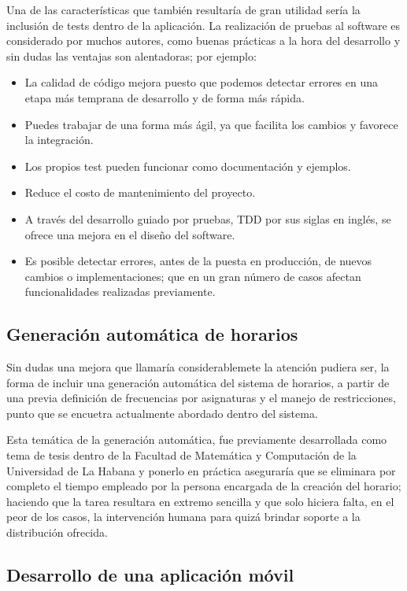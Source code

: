 Una de las características que también resultaría de gran utilidad sería la inclusión de tests dentro de la aplicación. La realización de pruebas al software es considerado por muchos autores, como buenas prácticas a la hora del desarrollo y sin dudas las ventajas son alentadoras; por ejemplo: \cite{testing} 
\begin{itemize}
	\item La calidad de código mejora puesto que podemos detectar errores en una etapa más temprana de desarrollo y de forma más rápida.
	\item Puedes trabajar de una forma más ágil, ya que facilita los cambios y favorece la integración.
	\item Los propios test pueden funcionar como documentación y ejemplos.
	\item Reduce el costo de mantenimiento del proyecto.
	\item A través del desarrollo guiado por pruebas, TDD por sus siglas en inglés, se ofrece una mejora en el diseño del software.
	\item Es posible detectar errores, antes de la puesta en producción, de nuevos cambios o implementaciones; que en un gran número de casos afectan funcionalidades realizadas previamente.
\end{itemize}

\subsection{Generación automática de horarios}

Sin dudas una mejora que llamaría considerablemete la atención pudiera ser, la forma de incluir una generación automática del sistema de horarios, a partir de una previa definición de frecuencias por asignaturas y el manejo de restricciones, punto que se encuetra actualmente abordado dentro del sistema.

Esta temática de la generación automática, fue previamente desarrollada como tema de tesis dentro de la Facultad de Matemática y Computación de la Universidad de La Habana y ponerlo en práctica aseguraría que se eliminara por completo el tiempo empleado por la persona encargada de la creación del horario; haciendo que la tarea resultara en extremo sencilla y que solo hiciera falta, en el peor de los casos, la intervención humana para quizá brindar soporte a la distribución ofrecida. 

\subsection{Desarrollo de una aplicación móvil}

